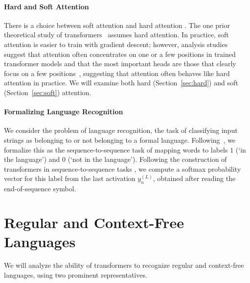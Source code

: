 \documentclass[11pt,a4paper]{article}
\begin{document}
\paragraph{Hard and Soft Attention}
There is a choice between soft attention and hard attention \cite{shen2018reinforced,perez2019turing}.
The one prior theoretical study of transformers~\cite{perez2019turing} assumes hard attention.
In practice, soft attention is easier to train with gradient descent; however, analysis studies suggest that attention often concentrates on one or a few positions in trained transformer models \cite{voita2019analyzing,clark2019bert} and that the most important heads are those that clearly focus on a few positions~\cite{voita2019analyzing}, suggesting that attention often behaves  like hard attention in practice. %
We will  examine both hard (Section~\ref{sec:hard}) and soft (Section~\ref{sec:soft}) attention.


\paragraph{Formalizing Language Recognition}
We consider the problem of language recognition, the task of classifying input strings as belonging to or not belonging to a formal language.
Following~\citet{weiss2018practical}, we formalize this as the sequence-to-sequence task of mapping words to labels $1$ (`in the language') and $0$ (`not in the language').
Following the construction of transformers in sequence-to-sequence tasks \cite{vaswani2017attention}, we compute a softmax probability vector for this label from the last activation $y_{n}^{(L)}$, obtained after reading the end-of-sequence symbol.


\section{Regular and Context-Free Languages}\label{sec:langs} %

We will analyze the ability of transformers to recognize regular and context-free languages, using two prominent representatives. %
\end{document}
